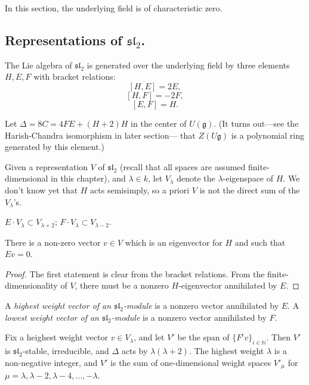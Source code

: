 In this section, the underlying field is of characteristic zero.

\subsection{Representations of $\mathfrak{sl}_2$.}
\label{subsection-representations-sl2}

The Lie algebra of $\mathfrak{sl}_2$ is generated over the underlying field by three elements $H, E, F$ with bracket relations:
$$[H,E]=2E,$$
$$[H,F]=-2F,$$
$$[E,F] = H.$$

Let $\Delta = 8 C = 4FE + (H+2) H$ in the center of $U(\mathfrak g)$. (It turns out---see the Harish-Chandra isomorphism in later section--- that $Z(U\mathfrak g)$ is a polynomial ring generated by this element.)

Given a representation $V$ of $\mathfrak{sl}_2$ (recall that all spaces are assumed finite-dimensional in this chapter), and $\lambda\in k$, let $V_\lambda$ denote the $\lambda$-eigenspace of $H$. We don't know yet that $H$ acts semisimply, so a priori $V$ is not the direct sum of the $V_\lambda$'s. 

\begin{lemma}
\label{lemma-shift-eigenspaces}
 $E\cdot V_\lambda\subset V_{\lambda+2}$; $F\cdot V_\lambda\subset V_{\lambda-2}$.

There is a non-zero vector $v\in V$ which is an eigenvector for $H$ and such that $Ev=0$. 
\end{lemma}

\begin{proof}
The first statement is clear from the bracket relations. From the finite-dimensionality of $V$, there must be a nonzero $H$-eigenvector annihilated by $E$.
\end{proof}

\begin{definition}
\label{definition-highest-weight}
A {\it highest weight vector of an $\mathfrak{sl}_2$-module} is a nonzero vector annihilated by $E$. A {\it lowest weight vector of an $\mathfrak{sl}_2$-module} is a nonzero vector annihilated by $F$. 
\end{definition}



\begin{proposition}
\label{proposition-sl2-irreducibles}
 Fix a heighest weight vector $v\in V_\lambda$, and let $V'$ be the span of $\{F^iv\}_{i\in\mathbb N}$. Then $V'$ is $\mathfrak{sl}_2$-stable, irreducible, and $\Delta$ acts by $\lambda(\lambda + 2)$. The highest weight $\lambda$ is a non-negative integer, and $V'$ is the sum of one-dimensional weight spaces $V'_{\mu}$ for $\mu = \lambda, \lambda-2,\lambda-4, \dots, -\lambda$.

\end{proposition}

